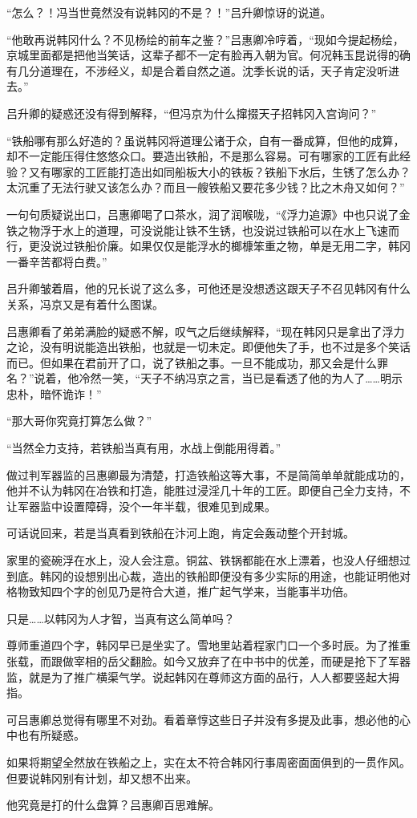 “怎么？！冯当世竟然没有说韩冈的不是？！”吕升卿惊讶的说道。

“他敢再说韩冈什么？不见杨绘的前车之鉴？”吕惠卿冷哼着，“现如今提起杨绘，京城里面都是把他当笑话，这辈子都不一定有脸再入朝为官。何况韩玉昆说得的确有几分道理在，不涉经义，却是合着自然之道。沈季长说的话，天子肯定没听进去。”

吕升卿的疑惑还没有得到解释，“但冯京为什么撺掇天子招韩冈入宫询问？”

“铁船哪有那么好造的？虽说韩冈将道理公诸于众，自有一番成算，但他的成算，却不一定能压得住悠悠众口。要造出铁船，不是那么容易。可有哪家的工匠有此经验？又有哪家的工匠能打造出如同船板大小的铁板？铁船下水后，生锈了怎么办？太沉重了无法行驶又该怎么办？而且一艘铁船又要花多少钱？比之木舟又如何？”

一句句质疑说出口，吕惠卿喝了口茶水，润了润喉咙，“《浮力追源》中也只说了金铁之物浮于水上的道理，可没说能让铁不生锈，也没说过铁船可以在水上飞速而行，更没说过铁船价廉。如果仅仅是能浮水的榔槺笨重之物，单是无用二字，韩冈一番辛苦都将白费。”

吕升卿皱着眉，他的兄长说了这么多，可他还是没想透这跟天子不召见韩冈有什么关系，冯京又是有着什么图谋。

吕惠卿看了弟弟满脸的疑惑不解，叹气之后继续解释，“现在韩冈只是拿出了浮力之论，没有明说能造出铁船，也就是一切未定。即便他失了手，也不过是多个笑话而已。但如果在君前开了口，说了铁船之事。一旦不能成功，那又会是什么罪名？”说着，他冷然一笑，“天子不纳冯京之言，当已是看透了他的为人了……明示忠朴，暗怀诡诈！”

“那大哥你究竟打算怎么做？”

“当然全力支持，若铁船当真有用，水战上倒能用得着。”

做过判军器监的吕惠卿最为清楚，打造铁船这等大事，不是简简单单就能成功的，他并不认为韩冈在冶铁和打造，能胜过浸淫几十年的工匠。即便自己全力支持，不让军器监中设置障碍，没个一年半载，很难见到成果。

可话说回来，若是当真看到铁船在汴河上跑，肯定会轰动整个开封城。

家里的瓷碗浮在水上，没人会注意。铜盆、铁锅都能在水上漂着，也没人仔细想过到底。韩冈的设想别出心裁，造出的铁船即便没有多少实际的用途，也能证明他对格物致知四个字的创见乃是符合大道，推广起气学来，当能事半功倍。

只是……以韩冈为人才智，当真有这么简单吗？

尊师重道四个字，韩冈早已是坐实了。雪地里站着程家门口一个多时辰。为了推重张载，而跟做宰相的岳父翻脸。如今又放弃了在中书中的优差，而硬是抢下了军器监，就是为了推广横渠气学。说起韩冈在尊师这方面的品行，人人都要竖起大拇指。

可吕惠卿总觉得有哪里不对劲。看着章惇这些日子并没有多提及此事，想必他的心中也有所疑惑。

如果将期望全然放在铁船之上，实在太不符合韩冈行事周密面面俱到的一贯作风。但要说韩冈别有计划，却又想不出来。

他究竟是打的什么盘算？吕惠卿百思难解。

